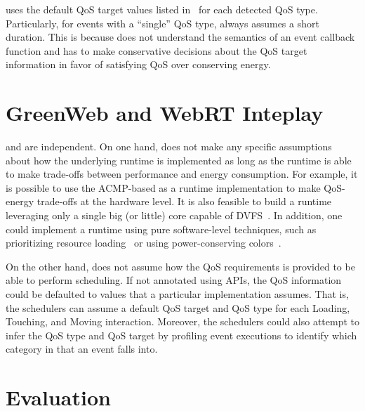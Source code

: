 \autogreen uses the default QoS target values listed in~ for each detected QoS type. Particularly, for events with a ``single'' QoS type, \autogreen always assumes a short duration. This is because \autogreen does not understand the semantics of an event callback function and has to make conservative decisions about the QoS target information in favor of satisfying QoS over conserving energy.

\section{GreenWeb and WebRT Inteplay}
\label{sec:lang:inter}

\greenweb and \webrt are independent. On one hand, \greenweb does not make any specific assumptions about how the underlying runtime is implemented as long as the runtime is able to make trade-offs between performance and energy consumption. For example, it is possible to use the ACMP-based \webrt as a \greenweb runtime implementation to make QoS-energy trade-offs at the hardware level. It is also feasible to build a runtime leveraging only a single big (or little) core capable of DVFS~\cite{pgdvfs,vsmp}. In addition, one could implement a \greenweb runtime using pure software-level techniques, such as prioritizing resource loading~\cite{klotski} or using power-conserving colors~\cite{chameleon}. 

On the other hand, \webrt does not assume how the QoS requirements is provided to be able to perform scheduling. If not annotated using \greenweb APIs, the QoS information could be defaulted to values that a particular implementation assumes. That is, the \webrt schedulers can assume a default QoS target and QoS type for each Loading, Touching, and Moving interaction. Moreover, the \webrt schedulers could also attempt to infer the QoS type and QoS target by profiling event executions to identify which category in  that an event falls into.


\section{Evaluation}
\label{sec:lang:eval}

